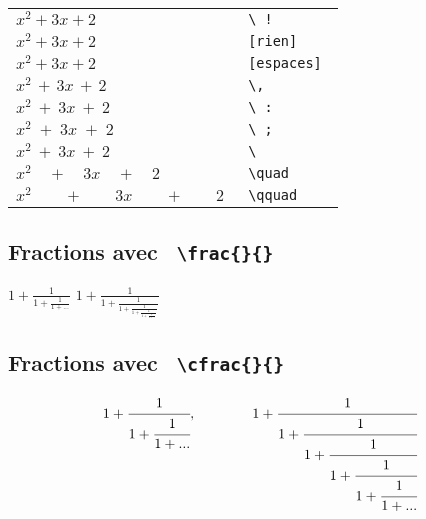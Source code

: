 \documentclass{report}
\begin{document}

\begin{tabular}{ll}

$ x^{2} \! + \! 3x \! + \! 2 $
& 
\texttt{ \textbackslash{}\!\! ! }
\\

$ x^{2}+3x+2 $ 
&
\texttt{ [rien] }
\\

$ x^{2} + 3x + 2 $ 
&
\texttt{ [espaces] }
\\

$ x^{2}\, +\, 3x\, +\, 2 $
&
\texttt{ \textbackslash{},}
\\

$ x^{2}\: +\: 3x\: +\: 2 $
&
\texttt{ \textbackslash{}\!\!\! :}
\\

$ x^{2}\; +\; 3x\; +\; 2 $
&
\texttt{ \textbackslash{}\!\! ;}
\\

$ x^{2}\ +\ 3x\ +\ 2 $
&
\texttt{ \textbackslash{}}
\\

$ x^{2}\quad +\quad 3x\quad +\quad 2 $
&
\texttt{ \textbackslash{}quad}
\\

$ x^{2}\qquad +\qquad 3x\qquad +\qquad 2 $
&
\texttt{ \textbackslash{}qquad}
\\

\end{tabular}


\subsection*{Fractions avec \normalfont \texttt{ \textbackslash{}frac\{\}\{\}  } }

\begin{center}
$ 1 + \frac{1}{1+\frac{1}{1+...}} $
\qquad \qquad
$ 1 + \frac{1}{1+\frac{1}{1+\frac{1}{1+\frac{1}{1+\frac{1}{1+...}}}}} $
\end{center}

\subsection*{Fractions avec \normalfont \texttt{ \textbackslash{}cfrac\{\}\{\}  } }

\begin{center}
$$ 1 + \cfrac{1}{1+\cfrac{1}{1+...}},  
\qquad\qquad
1 + \cfrac{1}{1+\cfrac{1}{1+\cfrac{1}{1+\cfrac{1}{1+\cfrac{1}{1+...}}}}} $$
\end{center}
\end{document}
